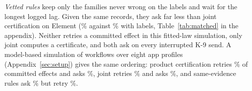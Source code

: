 \emph{Vetted rules} keep only the families never wrong on the labels and wait for the longest logged lag. Given the same records, they ask far less than joint certification on Element (\RsimMatchElemTwoVettedAsk\% against
\RsimMatchElemTwoJointAsk\% with \RsimMatchElemTwoLabelN{} labels, Table~\ref{tab:matched} in the appendix). Neither retries a committed effect in this fitted-law simulation, only joint computes a certificate, and both ask on every interrupted K-9 send.
A model-based simulation of \SimN{} workflows over eight app profiles (Appendix~\ref{sec:setup}) gives the same ordering: product certification retries \SimGhostPv\% of committed effects and asks \SimGhostAsk\%, joint retries \SimJointPv\% and asks \SimJointAsk\%, and same-evidence rules ask \SimRulesAsk\% but retry \SimRulesPv\%.
